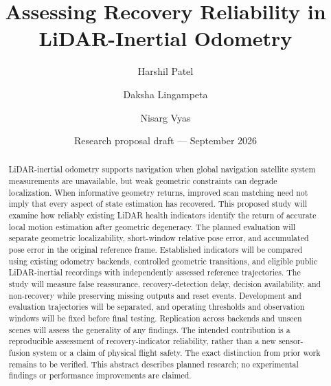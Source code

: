 \documentclass[11pt,a4paper]{article}
\title{Assessing Recovery Reliability in\protect\\ LiDAR-Inertial Odometry}
\author{Harshil Patel \and Daksha Lingampeta \and Nisarg Vyas}
\date{Research proposal draft --- September 2026}
\begin{document}
\maketitle
\begin{abstract}
LiDAR-inertial odometry supports navigation when global navigation satellite system measurements are unavailable, but weak geometric constraints can degrade localization. When informative geometry returns, improved scan matching need not imply that every aspect of state estimation has recovered. This proposed study will examine how reliably existing LiDAR health indicators identify the return of accurate local motion estimation after geometric degeneracy. The planned evaluation will separate geometric localizability, short-window relative pose error, and accumulated pose error in the original reference frame. Established indicators will be compared using existing odometry backends, controlled geometric transitions, and eligible public LiDAR-inertial recordings with independently assessed reference trajectories. The study will measure false reassurance, recovery-detection delay, decision availability, and non-recovery while preserving missing outputs and reset events. Development and evaluation trajectories will be separated, and operating thresholds and observation windows will be fixed before final testing. Replication across backends and unseen scenes will assess the generality of any findings. The intended contribution is a reproducible assessment of recovery-indicator reliability, rather than a new sensor-fusion system or a claim of physical flight safety. The exact distinction from prior work remains to be verified. This abstract describes planned research; no experimental findings or performance improvements are claimed.
\end{abstract}
\end{document}
